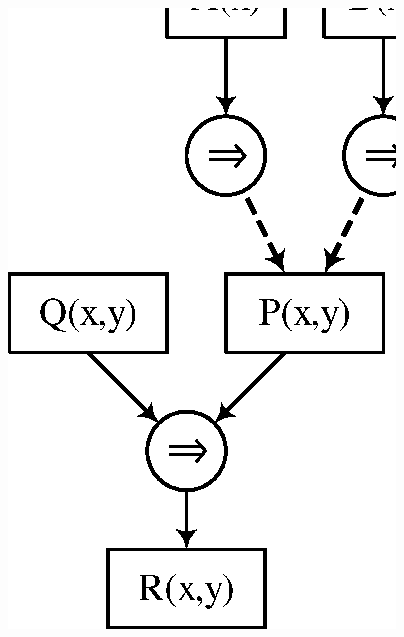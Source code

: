 \vspace{48pt}
\begin{figure}[htb]
  \begin{minipage}[t]{.47\textwidth}
  \centering
  \includegraphics[scale=0.8]{figures/disj1.eps}
  \end{minipage}
  \hfill
  \begin{minipage}[t]{.47\textwidth}
  \centering

\end{minipage}
\end{figure}
